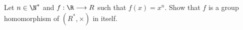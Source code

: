 Let $n \in \N^*$ and $f : \R \longrightarrow R$ such that $f(x) = x^n$.
Show that $f$ is a group homomorphism of $(R^*, \times)$ in itself.